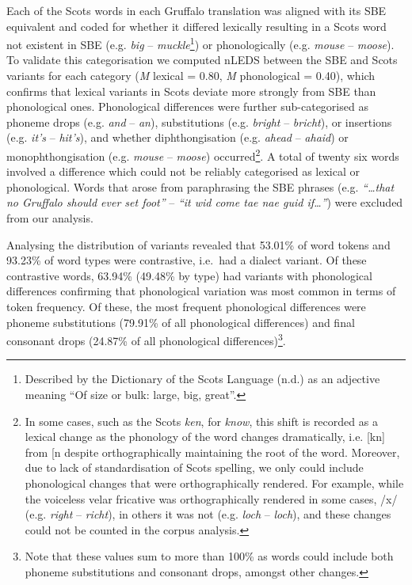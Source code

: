 \documentclass[doc,floatsintext]{apa6}
\let\rmarkdownfootnote\footnote%
\def\footnote{\protect\rmarkdownfootnote}
\begin{document}
Each of the Scots words in each Gruffalo translation was aligned with
its SBE equivalent and coded for whether it differed lexically resulting
in a Scots word not existent in SBE (e.g. \emph{big} --
\emph{muckle}\footnote{Described by the Dictionary of the Scots Language
  (n.d.) as an adjective meaning \enquote{Of size or bulk: large, big,
  great}.}) or phonologically (e.g. \emph{mouse} -- \emph{moose}). To
validate this categorisation we computed nLEDS between the SBE and Scots
variants for each category (\emph{M} lexical = 0.80, \emph{M}
phonological = 0.40), which confirms that lexical variants in Scots
deviate more strongly from SBE than phonological ones. Phonological
differences were further sub-categorised as phoneme drops (e.g.
\emph{and} -- \emph{an}), substitutions (e.g. \emph{bright} --
\emph{bricht}), or insertions (e.g. \emph{it's} -- \emph{hit's}), and
whether diphthongisation (e.g. \emph{ahead} -- \emph{ahaid}) or
monophthongisation (e.g. \emph{mouse} -- \emph{moose})
occurred\footnote{In some cases, such as the Scots \emph{ken}, for
  \emph{know}, this shift is recorded as a lexical change as the
  phonology of the word changes dramatically, i.e. {[}kn{]}
  from {[}n\textipa{U}{]} despite orthographically
  maintaining the root of the word. Moreover, due to lack of
  standardisation of Scots spelling, we only could include phonological
  changes that were orthographically rendered. For example, while the
  voiceless velar fricative was orthographically rendered in some cases,
  /x/ (e.g. \emph{right} -- \emph{richt}), in others it was not (e.g.
  \emph{loch} -- \emph{loch}), and these changes could not be counted in
  the corpus analysis.}. A total of twenty six words involved a
difference which could not be reliably categorised as lexical or
phonological. Words that arose from paraphrasing the SBE phrases (e.g.
\emph{\enquote{\ldots{}that no Gruffalo should ever set foot}} --
\emph{\enquote{it wid come tae nae guid if\ldots{}}}) were excluded from
our analysis.

Analysing the distribution of variants revealed that 53.01\% of word
tokens and 93.23\% of word types were contrastive, i.e.~had a dialect
variant. Of these contrastive words, 63.94\% (49.48\% by type) had
variants with phonological differences confirming that phonological
variation was most common in terms of token frequency. Of these, the
most frequent phonological differences were phoneme substitutions
(79.91\% of all phonological differences) and final consonant drops
(24.87\% of all phonological differences)\footnote{Note that these
  values sum to more than 100\% as words could include both phoneme
  substitutions and consonant drops, amongst other changes.}.
\end{document}
